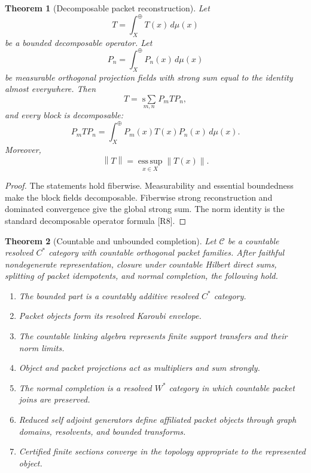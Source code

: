 \documentclass{aomart}
\newtheorem{theorem}{Theorem}[section]
\theoremstyle{definition}
\theoremstyle{remark}
\newcommand{\Ccal}{\mathcal C}
\newcommand{\norm}[1]{\left\lVert#1\right\rVert}
\newcommand{\Rcite}[1]{\textup{[#1]}}
\begin{document}
\begin{theorem}[Decomposable packet reconstruction]\label{thm:decomposable_reconstruction}
Let
\[
 T=\int_X^{\oplus}T(x)\,d\mu(x)
\]
be a bounded decomposable operator. Let
\[
 P_n=\int_X^{\oplus}P_n(x)\,d\mu(x)
\]
be measurable orthogonal projection fields with strong sum equal to the identity almost everywhere. Then
\[
 \boxed{
 T
 =
 \operatorname*{s\!\!\sum}_{m,n}P_mTP_n,
 }
\]
and every block is decomposable:
\[
 P_mTP_n
 =
 \int_X^{\oplus}P_m(x)T(x)P_n(x)\,d\mu(x).
\]
Moreover,
\[
 \norm{T}
 =
 \operatorname*{ess\,sup}_{x\in X}\norm{T(x)}.
\]
\end{theorem}

\begin{proof}
The statements hold fiberwise. Measurability and essential boundedness make the block fields decomposable. Fiberwise strong reconstruction and dominated convergence give the global strong sum. The norm identity is the standard decomposable operator formula \Rcite{R8}.
\end{proof}

\begin{theorem}[Countable and unbounded completion]\label{thm:countable_completion}
Let \(\Ccal\) be a countable resolved \(C^*\) category with countable orthogonal packet families. After faithful nondegenerate representation, closure under countable Hilbert direct sums, splitting of packet idempotents, and normal completion, the following hold.
\begin{enumerate}
\item The bounded part is a countably additive resolved \(C^*\) category.
\item Packet objects form its resolved Karoubi envelope.
\item The countable linking algebra represents finite support transfers and their norm limits.
\item Object and packet projections act as multipliers and sum strongly.
\item The normal completion is a resolved \(W^*\) category in which countable packet joins are preserved.
\item Reduced self adjoint generators define affiliated packet objects through graph domains, resolvents, and bounded transforms.
\item Certified finite sections converge in the topology appropriate to the represented object.
\end{enumerate}
\end{theorem}
\end{document}
